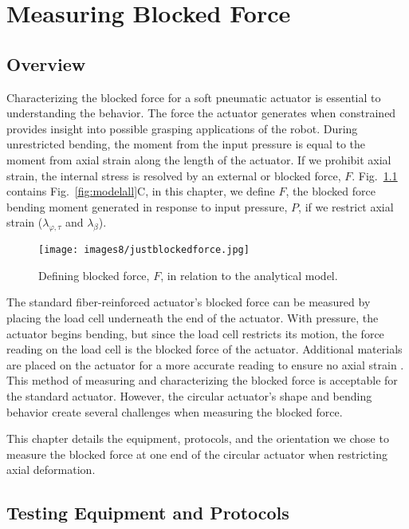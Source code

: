 \chapter{Measuring Blocked Force}
\label{chapter:blockedforce}

\section{Overview}
Characterizing the blocked force for a soft pneumatic actuator is essential to understanding the behavior. The force the actuator generates when constrained provides insight into possible grasping applications of the robot. During unrestricted bending, the moment from the input pressure is equal to the moment from axial strain along the length of the actuator. If we prohibit axial strain, the internal stress is resolved by an external or blocked force, $F$. Fig.~\ref{fig:justblockedforce} contains Fig.~\ref{fig:modelall}C, in this chapter, we define $F$, the blocked force bending moment generated in response to input pressure, $P$, if we restrict axial strain ($\lambda_{\varphi,\tau}$ and $\lambda_\beta$). 

\begin{figure}[ht]
    \centering
     \texttt{[image: images8/justblockedforce.jpg]}
    \caption{Defining blocked force, $F$, in relation to the analytical model.}
    \label{fig:justblockedforce}
\end{figure}

The standard fiber-reinforced actuator's blocked force can be measured by placing the load cell underneath the end of the actuator. With pressure, the actuator begins bending, but since the load cell restricts its motion, the force reading on the load cell is the blocked force of the actuator. Additional materials are placed on the actuator for a more accurate reading to ensure no axial strain \cite{polygerinos_modeling_2015}. This method of measuring and characterizing the blocked force is acceptable for the standard actuator. However, the circular actuator's shape and bending behavior create several challenges when measuring the blocked force. 

This chapter details the equipment, protocols, and the orientation we chose to measure the blocked force at one end of the circular actuator when restricting axial deformation. 

\section{Testing Equipment and Protocols}

